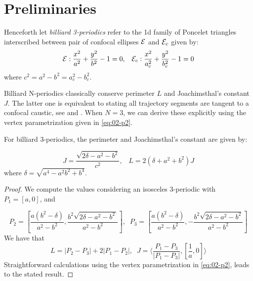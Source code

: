 \section{Preliminaries}

Henceforth let {\em billiard 3-periodics} refer to the 1d family of Poncelet triangles interscribed between pair of confocal ellipses $\mathcal{E}$ and $\mathcal{E}_c$ given by:
\[ \mathcal{E}:\frac{x^2}{a^2}+\frac{y^2}{b^2}-1=0,\;\;\;\mathcal{E}_c:\frac{x^2}{a_c^2}+\frac{y^2}{b_c^2}-1=0\]
where $c^2=a^2-b^2=a_c^2-b_c^2$.

Billiard N-periodics classically conserve  perimeter $L$ and Joachimsthal's constant $J$. The latter one is equivalent to stating all trajectory segments are tangent to a confocal caustic, see \cite[Thm 4.4]{sergei91} and \cite{arnold2020-joachim}.
When $N=3$, we can derive these explicitly using the vertex parametrization given in \cref{eq:02-p2}.
 
\begin{proposition}
For billiard 3-periodics, the perimeter and Joachimsthal's constant are given by:

\begin{equation*}
J=\frac{\sqrt{2\delta-a^2-b^2}}{c^2},\;\;\;L=2(\delta+a^2+b^2)J
\label{eqn:n3-L-J}
\end{equation*}
where $\delta=\sqrt{a^4-a^2b^2+b^4}$.
\end{proposition}

\begin{proof} We compute the values considering  an isosceles 3-periodic with $P_1=[a,0]$, and

 {\small 
 \begin{equation} \label{eq:orbita3-isosceles}
 P_2=\left[   {\frac {a \left(  {b}^{2}-\delta \right) }{   a^2-b^2 
 			  }},{\frac {{b}^{2}\sqrt {2 \delta -{a}^{2}-{b}^{2}\,
 				}}{{a}^{2}-{b}^{2}}} 
 	\right], \;\; P_3=\left[  {\frac {a \left(  {b}^{2}-\delta \right) }{   a^2-b^2   
 	}},-{\frac {{b}^{2}\sqrt {2\delta-{a}^{2}-{b}^{2} 
 				}}{{a}^{2}-{b}^{2}}} 
 	\right]
 	\end{equation}
 	}
 	We have that
 	\[L=|P_2-P_3|+2|P_1-P_2|,\;\;
 	 J=\langle \frac{P_1-P_3}{|P_1-P_3|},[\frac{1}{a},0]\rangle\]
 	 Straightforward calculations using the vertex parametrization in \cref{eq:02-p2}, leads to the stated result.
\end{proof}

